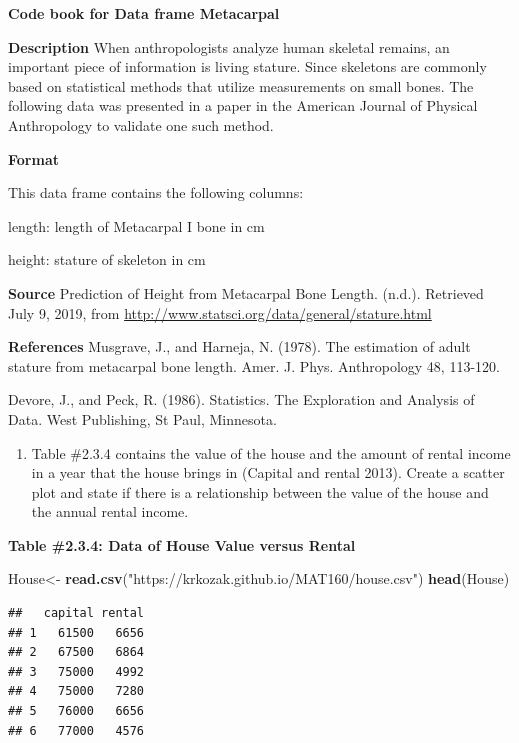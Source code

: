 \documentclass[]{book}
\newenvironment{Shaded}{\begin{snugshade}}{\end{snugshade}}
\newcommand{\KeywordTok}[1]{\textcolor[rgb]{0.13,0.29,0.53}{\textbf{#1}}}
\newcommand{\NormalTok}[1]{#1}
\newcommand{\StringTok}[1]{\textcolor[rgb]{0.31,0.60,0.02}{#1}}
\providecommand{\tightlist}{%
  \setlength{\itemsep}{0pt}\setlength{\parskip}{0pt}}
\begin{document}
\textbf{Code book for Data frame Metacarpal}

\textbf{Description}
When anthropologists analyze human skeletal remains, an important piece of information is living stature. Since skeletons are commonly based on statistical methods that utilize measurements on small bones. The following data was presented in a paper in the American Journal of Physical Anthropology to validate one such method.

\textbf{Format}

This data frame contains the following columns:

length: length of Metacarpal I bone in cm

height: stature of skeleton in cm

\textbf{Source}
Prediction of Height from Metacarpal Bone Length. (n.d.). Retrieved July 9, 2019, from \url{http://www.statsci.org/data/general/stature.html}

\textbf{References}
Musgrave, J., and Harneja, N. (1978). The estimation of adult stature from metacarpal bone length. Amer. J. Phys. Anthropology 48, 113-120.

Devore, J., and Peck, R. (1986). Statistics. The Exploration and Analysis of Data. West Publishing, St Paul, Minnesota.

\begin{enumerate}
\def\labelenumi{\arabic{enumi}.}
\setcounter{enumi}{1}
\tightlist
\item
  Table \#2.3.4 contains the value of the house and the amount of rental income in a year that the house brings in (Capital and rental 2013). Create a scatter plot and state if there is a relationship between the value of the house and the annual rental income.
\end{enumerate}

\textbf{Table \#2.3.4: Data of House Value versus Rental}

\begin{Shaded}
\begin{Highlighting}[]
\NormalTok{House<-}\StringTok{ }\KeywordTok{read.csv}\NormalTok{(}\StringTok{"https://krkozak.github.io/MAT160/house.csv"}\NormalTok{)}
\KeywordTok{head}\NormalTok{(House)}
\end{Highlighting}
\end{Shaded}

\begin{verbatim}
##   capital rental
## 1   61500   6656
## 2   67500   6864
## 3   75000   4992
## 4   75000   7280
## 5   76000   6656
## 6   77000   4576
\end{verbatim}
\end{document}
